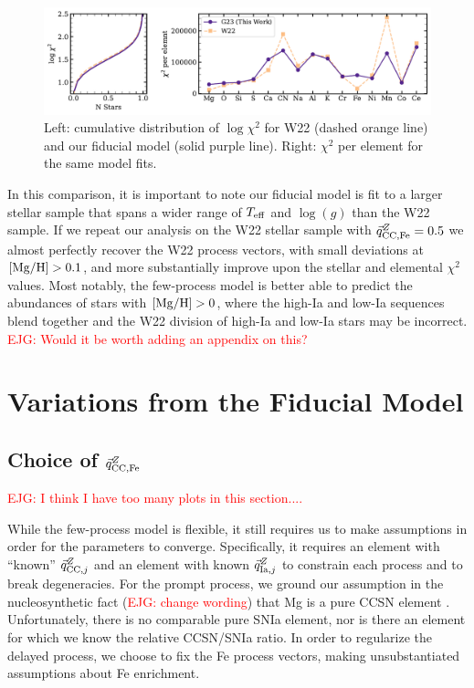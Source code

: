 \documentclass[modern]{aastex631}
\newcommand{\mgh}{[{\rm Mg}/{\rm H}]}
\newcommand{\logg}{\log(g)}
\newcommand{\teff}{T_{\rm eff}}
\newcommand{\qcc}{\vec{q}_{{\rm CC,}j}^{Z}}
\newcommand{\qccFe}{\vec{q}_{{\rm CC, Fe}}^{Z}}
\newcommand{\qIa}{\vec{q}_{{\rm Ia,}j}^{Z}}
\newcommand{\ejg}[1]{\textcolor{red}{EJG: #1}}
\begin{document}
\begin{figure}[htb!]
    \centering
    \includegraphics[width=\textwidth]{Paper/Figures/comp_w22.pdf}
    \caption{Left: cumulative distribution of $\log \chi^2$ for W22 (dashed orange line) and our fiducial model (solid purple line). Right: $\chi^2$ per element for the same model fits. }
    \label{fig:qs}
\end{figure}

In this comparison, it is important to note our fiducial model is fit to a larger stellar sample that spans a wider range of $\teff$ and $\logg$ than the W22 sample. If we repeat our analysis on the W22 stellar sample with $\qccFe=0.5$ we almost perfectly recover the W22 process vectors, with small deviations at $\mgh>0.1$, and more substantially improve upon the stellar and elemental $\chi^2$ values. Most notably, the few-process model is better able to predict the abundances of stars with $\mgh>0$, where the high-Ia and low-Ia sequences blend together and the W22 division of high-Ia and low-Ia stars may be incorrect. \ejg{Would it be worth adding an appendix on this?}

\section{Variations from the Fiducial Model} \label{sec:variations}

\subsection{Choice of $\qccFe$} \label{subsec:fcc}

\ejg{I think I have too many plots in this section....}

While the few-process model is flexible, it still requires us to make assumptions in order for the parameters to converge. Specifically, it requires an element with ``known'' $\qcc$ and an element with known $\qIa$ to constrain each process and to break degeneracies. For the prompt process, we ground our assumption in the nucleosynthetic fact (\ejg{change wording}) that Mg is a pure CCSN element \citep[e.g.,][]{andrews2017}. Unfortunately, there is no comparable pure SNIa element, nor is there an element for which we know the relative CCSN/SNIa ratio. In order to regularize the delayed process, we choose to fix the Fe process vectors, making unsubstantiated assumptions about Fe enrichment. 
\end{document}
